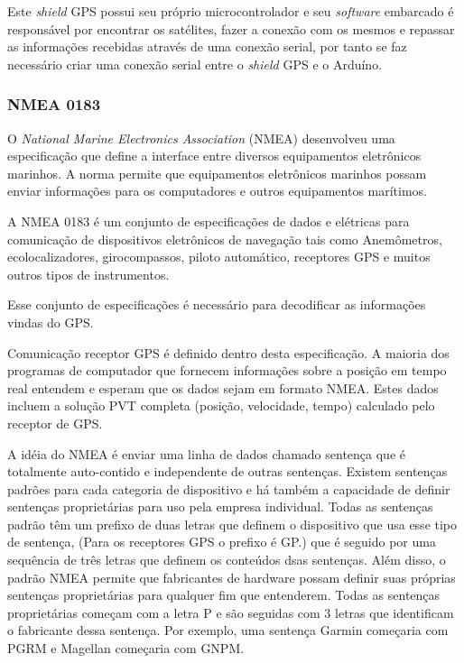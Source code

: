 \documentclass[final,12pt, times, 5p, twocolumn]{elsarticle}
\begin{document}
Este \textit{shield}  GPS possui seu próprio microcontrolador e seu \textit{software} embarcado é responsável por encontrar os satélites, fazer a conexão com os mesmos e repassar as informações recebidas através de uma conexão serial, por tanto se faz necessário criar uma conexão serial entre o \textit{shield} GPS e o Arduíno. 

\subsubsection{NMEA 0183}

O \textit{National Marine Electronics Association} (NMEA) desenvolveu uma especificação que define a interface entre diversos equipamentos eletrônicos marinhos. A norma permite que equipamentos eletrônicos marinhos possam enviar informações para os computadores e outros equipamentos marítimos.

A NMEA 0183 é um conjunto de especificações de dados e elétricas para comunicação de dispositivos eletrônicos de navegação tais como Anemômetros, ecolocalizadores, girocompassos, piloto automático, receptores GPS e muitos outros tipos de instrumentos.

Esse conjunto de especificações é necessário para decodificar as informações vindas do GPS.

Comunicação receptor GPS é definido dentro desta especificação. A maioria dos programas de computador que fornecem informações sobre a posição em tempo real entendem e esperam que os dados sejam em formato NMEA. Estes dados incluem a solução PVT completa (posição, velocidade, tempo) calculado pelo receptor de GPS. 

A idéia do NMEA é enviar uma linha de dados chamado sentença que é totalmente auto-contido e independente de outras sentenças. Existem sentenças padrões para cada categoria de dispositivo e há também a capacidade de definir sentenças proprietárias para uso pela empresa individual. Todas as sentenças padrão têm um prefixo de duas letras que definem o dispositivo que usa esse tipo de sentença, (Para os receptores GPS o prefixo é GP.) que é seguido por uma sequência de três letras que definem os conteúdos dsas sentenças. Além disso, o padrão NMEA permite que fabricantes de hardware possam definir suas próprias sentenças proprietárias para qualquer fim que entenderem. Todas as sentenças proprietárias começam com a letra P e são seguidas com 3 letras que identificam o fabricante dessa sentença. Por exemplo, uma sentença Garmin começaria com PGRM e Magellan começaria com GNPM.
\end{document}
